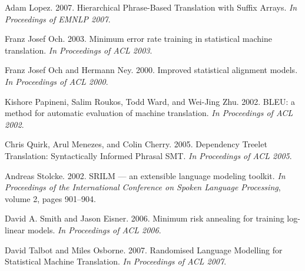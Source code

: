 \documentclass[11pt]{article}
\begin{document}
\begin{thebibliography}{}
Adam Lopez. 2007.
Hierarchical Phrase-Based Translation with Suffix Arrays.
\emph{In Proceedings of EMNLP 2007}.


%

Franz Josef Och. 2003. Minimum error rate training in
statistical machine translation.
\emph{In Proceedings of ACL 2003}.

Franz Josef Och and Hermann Ney. 2000. Improved statistical
alignment models. \emph{In Proceedings of ACL 2000}.


Kishore Papineni, Salim Roukos, Todd Ward, and Wei-Jing Zhu. 2002.
BLEU: a method for automatic evaluation of machine translation.
\emph{In Proceedings of ACL 2002}.

Chris Quirk, Arul Menezes, and Colin Cherry. 2005.
Dependency Treelet Translation: Syntactically Informed Phrasal SMT.
\emph{In Proceedings of ACL 2005}. %
%

Andreas Stolcke. 2002. SRILM --- an extensible language
modeling toolkit. \emph{In Proceedings of the International
Conference on Spoken Language Processing}, volume 2, pages 901--904.


David A. Smith and Jason Eisner. 2006.
Minimum risk annealing for training log-linear models.
\emph{In Proceedings of ACL 2006}. %

David Talbot and Miles Osborne. 2007.
Randomised Language Modelling for Statistical Machine Translation.
\emph{In Proceedings of ACL 2007}.


\end{thebibliography}
\end{document}
